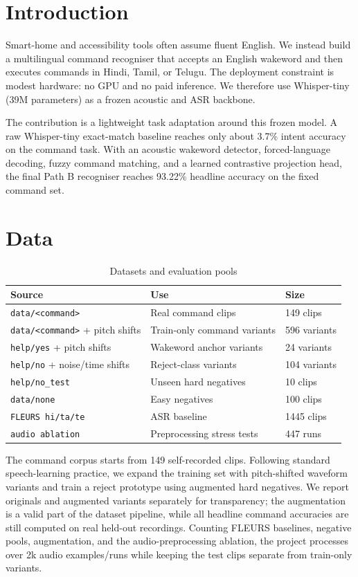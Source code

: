 \documentclass[11pt]{article}
\begin{document}
\section{Introduction}

Smart-home and accessibility tools often assume fluent English. We instead
build a multilingual command recogniser that accepts an English wakeword and
then executes commands in Hindi, Tamil, or Telugu. The deployment constraint is
modest hardware: no GPU and no paid inference. We therefore use Whisper-tiny
(39M parameters) as a frozen acoustic and ASR backbone.

The contribution is a lightweight task adaptation around this frozen model.
A raw Whisper-tiny exact-match baseline reaches only about 3.7\% intent
accuracy on the command task. With an acoustic wakeword detector,
forced-language decoding, fuzzy command matching, and a learned contrastive
projection head, the final Path B recogniser reaches 93.22\% headline
accuracy on the fixed command set.

\section{Data}

\begin{table}[h]
\centering
\caption{Datasets and evaluation pools}
\begin{tabular}{lll}
\toprule
Source & Use & Size \\
\midrule
\texttt{data/<command>} & Real command clips & 149 clips \\
\texttt{data/<command>} + pitch shifts & Train-only command variants & 596 variants \\
\texttt{help/yes} + pitch shifts & Wakeword anchor variants & 24 variants \\
\texttt{help/no} + noise/time shifts & Reject-class variants & 104 variants \\
\texttt{help/no\_test} & Unseen hard negatives & 10 clips \\
\texttt{data/none} & Easy negatives & 100 clips \\
\texttt{FLEURS hi/ta/te} & ASR baseline & 1445 clips \\
\texttt{audio ablation} & Preprocessing stress tests & 447 runs \\
\bottomrule
\end{tabular}
\end{table}

The command corpus starts from 149 self-recorded clips. Following standard
speech-learning practice, we expand the training set with pitch-shifted
waveform variants and train a reject prototype using augmented hard negatives.
We report originals and augmented variants separately for transparency; the
augmentation is a valid part of the dataset pipeline, while all headline
command accuracies are still computed on real held-out recordings. Counting
FLEURS baselines, negative pools, augmentation, and the audio-preprocessing
ablation, the project processes over 2k audio examples/runs while keeping the
test clips separate from train-only variants.
\end{document}
